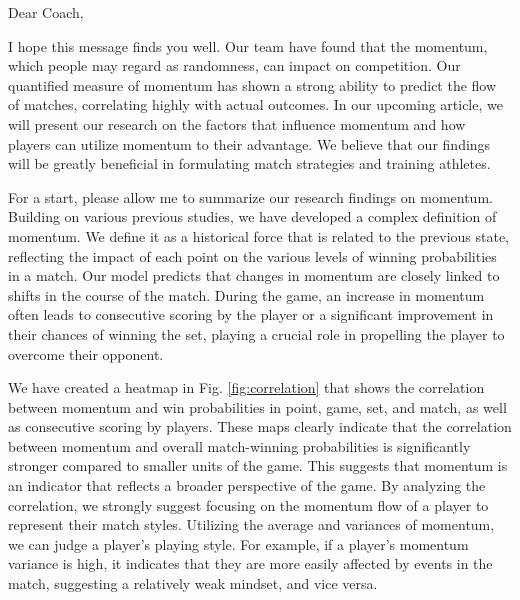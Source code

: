 \documentclass{mcmthesis}
\begin{document}
\begin{appendices}
\memodate{\today}

\begin{memo}[Memorandum]
\newpage
Dear Coach,

I hope this message finds you well. Our team have found that the momentum, which people may regard as randomness, can impact on competition. Our quantified measure of momentum has shown a strong ability to predict the flow of matches, correlating highly with actual outcomes. In our upcoming article, we will present our research on the factors that influence momentum and how players can utilize momentum to their advantage. We believe that our findings will be greatly beneficial in formulating match strategies and training athletes.

For a start, please allow me to summarize our research findings on momentum. Building on various previous studies, we have developed a complex definition of momentum. We define it as a historical force that is related to the previous state, reflecting the impact of each point on the various levels of winning probabilities in a match. Our model predicts that changes in momentum are closely linked to shifts in the course of the match. During the game, an increase in momentum often leads to consecutive scoring by the player or a significant improvement in their chances of winning the set, playing a crucial role in propelling the player to overcome their opponent.

We have created a heatmap in Fig. \ref{fig:correlation} that shows the correlation between momentum and win probabilities in point, game, set, and match, as well as consecutive scoring by players. These maps clearly indicate that the correlation between momentum and overall match-winning probabilities is significantly stronger compared to smaller units of the game. This suggests that momentum is an indicator that reflects a broader perspective of the game. By analyzing the correlation, we strongly suggest focusing on the momentum flow of a player to represent their match styles. Utilizing the average and variances of momentum, we can judge a player's playing style. For example, if a player's momentum variance is high, it indicates that they are more easily affected by events in the match, suggesting a relatively weak mindset, and vice versa.


\end{memo}
\end{appendices}
\end{document}
